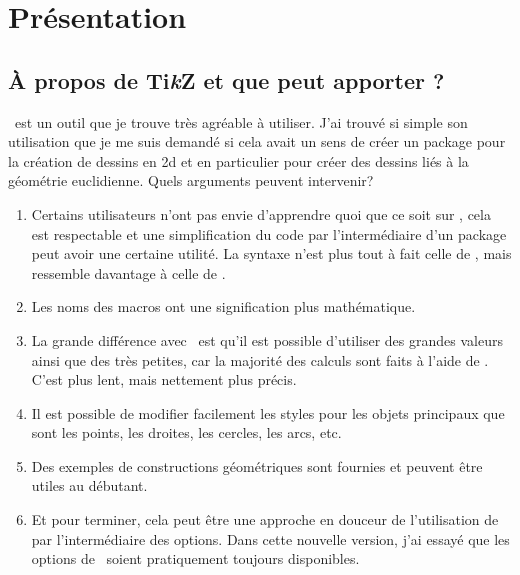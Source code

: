 
\section{Présentation}

\subsection{À propos de Ti\emph{k}Z et que peut apporter  ? }
\TIKZ\ est un outil que je trouve très agréable à utiliser. J'ai trouvé si simple son utilisation que je me suis demandé si cela avait un sens de créer un package pour  la création de dessins en 2d et en particulier pour créer des dessins liés à la géométrie euclidienne.  Quels arguments peuvent intervenir? 

\begin{enumerate}

\item Certains utilisateurs n'ont pas envie d'apprendre quoi que ce soit sur  \TIKZ, cela est respectable et une simplification du code par l'intermédiaire d'un package peut avoir une certaine utilité. La syntaxe n'est plus tout à fait celle de  \TIKZ, mais ressemble davantage à celle de \LATEX.

\item  Les noms des macros ont une signification plus mathématique.

\item La grande différence avec \TIKZ\ est qu'il est possible d'utiliser des grandes valeurs ainsi que des très petites, car la majorité des calculs sont faits à l'aide de . C'est plus lent, mais nettement plus précis.

\item Il est possible de modifier facilement les styles pour  les objets principaux que sont les points, les droites, les cercles, les arcs, etc. 

\item Des exemples de constructions géométriques sont fournies et peuvent être utiles au débutant.
  
\item  Et pour terminer, cela peut être une approche en douceur de l'utilisation de \TIKZ\, par l'intermédiaire des options. Dans cette nouvelle version, j'ai essayé que les options de \TIKZ\ soient pratiquement toujours disponibles.

\end{enumerate}

